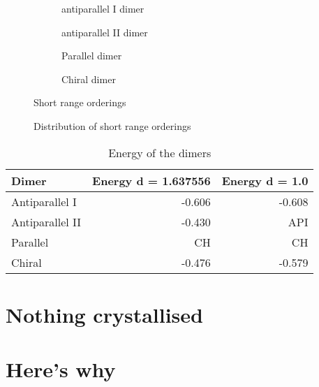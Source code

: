 \begin{figure}
    \begin{subfigure}{0.5\textwidth}
        \caption{antiparallel I dimer}
        \label{fig:antiparallel i}
    \end{subfigure}
    \begin{subfigure}{0.5\textwidth}
        \caption{antiparallel II dimer}
        \label{fig:antiparallel ii}
    \end{subfigure}
    \begin{subfigure}{0.5\textwidth}
        \caption{Parallel dimer}
        \label{fig:parallel}
    \end{subfigure}
    \begin{subfigure}{0.5\textwidth}
        \caption{Chiral dimer}
        \label{fig:chiral}
    \end{subfigure}
    \caption{Short range orderings}
    \label{fig:short range order}
\end{figure}

\begin{figure}
    \caption{Distribution of short range orderings}
    \label{fig:short order hist}
\end{figure}

\begin{table}
    \centering
    \begin{tabular}{l r r}
        Dimer & Energy d = 1.637556 & Energy d = 1.0 \\ \hline
        Antiparallel I &  -0.606 & -0.608 \\
        Antiparallel II & -0.430 & API\\
        Parallel & CH & CH \\
        Chiral & -0.476 & -0.579 \\
    \end{tabular}
    \caption{Energy of the dimers}
    \label{tab:dimer energy}
\end{table}

\section{Nothing crystallised}

\section{Here's why}


